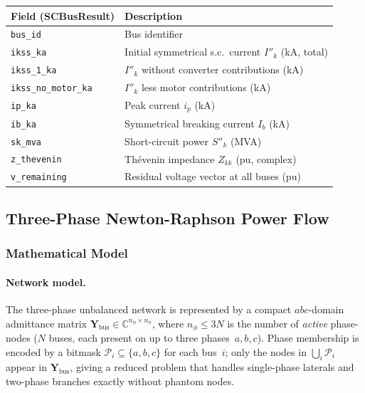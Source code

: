 \begin{center}
\begin{tabular}{ll}
\hline\hline
\textbf{Field (SCBusResult)} & \textbf{Description} \\
\hline
\texttt{bus\_id} & Bus identifier \\
\texttt{ikss\_ka} & Initial symmetrical s.c.\ current $I''_k$ (kA, total) \\
\texttt{ikss\_1\_ka} & $I''_k$ without converter contributions (kA) \\
\texttt{ikss\_no\_motor\_ka} & $I''_k$ less motor contributions (kA) \\
\texttt{ip\_ka} & Peak current $i_p$ (kA) \\
\texttt{ib\_ka} & Symmetrical breaking current $I_b$ (kA) \\
\texttt{sk\_mva} & Short-circuit power $S''_k$ (MVA) \\
\texttt{z\_thevenin} & Thévenin impedance $Z_{kk}$ (pu, complex) \\
\texttt{v\_remaining} & Residual voltage vector at all buses (pu) \\
\hline\hline
\end{tabular}
\end{center}

\subsection{Three-Phase Newton-Raphson Power Flow}
\label{sec:three-phase-nr}

\subsubsection{Mathematical Model}
\label{sec:3ph-nr-math}

\paragraph{Network model.}
The three-phase unbalanced network is represented by a compact
$abc$-domain admittance matrix $\mathbf{Y}_{\text{bus}} \in
\mathbb{C}^{n_\phi \times n_\phi}$, where $n_\phi \le 3N$ is the
number of \emph{active} phase-nodes ($N$ buses, each present on up to
three phases~$a, b, c$).  Phase membership is encoded by a bitmask
$\mathcal{P}_i \subseteq \{a,b,c\}$ for each bus~$i$; only the nodes
in $\bigcup_i \mathcal{P}_i$ appear in $\mathbf{Y}_{\text{bus}}$, giving
a reduced problem that handles single-phase laterals and two-phase branches
exactly without phantom nodes.

